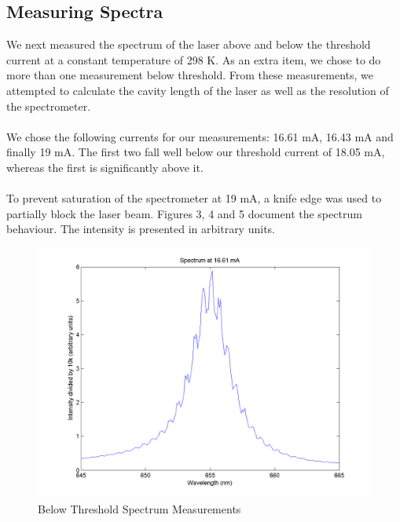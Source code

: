 \documentclass[10pt,a4paper]{article}
\begin{document}
\subsection*{Measuring Spectra}
We next measured the spectrum of the laser above and below the threshold current at a constant temperature of 298 K. As an extra item, we chose to do more than one measurement below threshold. From these measurements, we attempted to calculate the cavity length of the laser as well as the resolution of the spectrometer.\\
\\
We chose the following currents for our measurements: 16.61 mA, 16.43 mA and finally 19 mA. The first two fall well below our threshold current of 18.05 mA, whereas the first is significantly above it.\\
\\
To prevent saturation of the spectrometer at 19 mA, a knife edge was used to partially block the laser beam. Figures 3, 4 and 5 document the spectrum behaviour. The intensity is presented in arbitrary units.
\begin{figure}[H]
\centering
\includegraphics[scale = 0.4]{../Analysis/BelThresh1.png}
\caption{Below Threshold Spectrum Measurements} 
\end{figure} 
\end{document}
